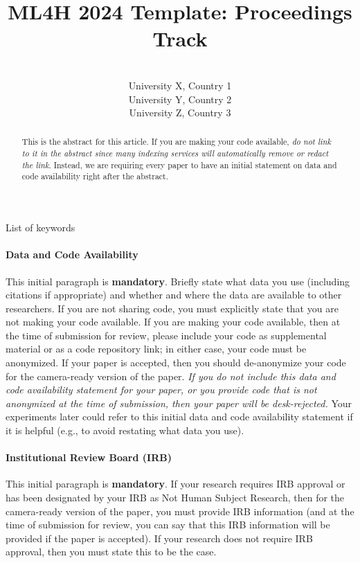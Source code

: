 \documentclass[pmlr,twocolumn,10pt]{jmlr} %
\title[Short Title]{ML4H 2024 Template: Proceedings Track}
\author{%
\Name{First Author 1}\equal{These authors contributed equally} \Email{abc@sample.com}\\
\addr University X, Country 1
\AND
\Name{First Author 2}\footnotemark[1] \Email{def@sample.com}\\
\addr University Y, Country 2
\AND
\Name{Last Author} \Email{ghi@sample.com}\\
\addr University Z, Country 3
}
\begin{document}
\maketitle

\begin{abstract}
This is the abstract for this article. If you are making your code
available, \emph{do not link to it in the abstract since many indexing
services will automatically remove or redact the link}. Instead,
we are requiring every paper to have an initial statement on data and
code availability right after the abstract.
\end{abstract}
\begin{keywords}
List of keywords
\end{keywords}

\paragraph*{Data and Code Availability}
This initial paragraph is \textbf{mandatory}. Briefly state what data you
use (including citations if appropriate) and whether and where the data are
available to other researchers.
If you are not sharing code, you must explicitly state that you are not
making your code available. If you are making your code available, then
at the time of submission for review, please include your code as
supplemental material or as a code repository link; in either case, your
code must be anonymized. If your paper is accepted, then you should
de-anonymize your code for the camera-ready version of the paper. \emph{If
you do not include this data and code availability statement for your
paper, or you provide code that is not anonymized at the time of
submission, then your paper will be desk-rejected.} Your experiments later
could refer to this initial data and code availability statement if it is
helpful (e.g., to avoid restating what data you use).

\paragraph*{Institutional Review Board (IRB)}
This initial paragraph is \textbf{mandatory}. If your research requires IRB
approval or has been designated by your IRB as Not Human Subject
Research, then for the camera-ready version of the paper, you must
provide IRB information (and at the time of submission for review, you
can say that this IRB information will be provided if the paper is
accepted). If your research does not require IRB approval, then you
must state this to be the case. 
\end{document}
